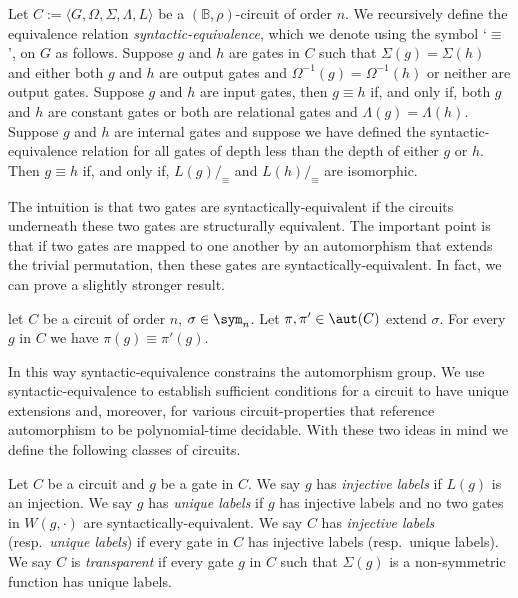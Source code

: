\documentclass[a4paper,UKenglish]{lipics-v2018}
\begin{document}
\begin{definition}
  Let $C := \langle G, \Omega, \Sigma, \Lambda, L \rangle$ be a $(\mathbb{B},
  \rho)$-circuit of order $n$. We recursively define the equivalence relation
  \emph{syntactic-equivalence}, which we denote using the symbol `$\equiv$', on
  $G$ as follows. Suppose $g$ and $h$ are gates in $C$ such that $\Sigma (g) =
  \Sigma(h)$ and either both $g$ and $h$ are output gates and $\Omega^{-1}(g) =
  \Omega^{-1}(h)$ or neither are output gates. Suppose $g$ and $h$ are input
  gates, then $g \equiv h$ if, and only if, both $g$ and $h$ are constant gates
  or both are relational gates and $\Lambda(g) = \Lambda (h)$. Suppose $g$ and
  $h$ are internal gates and suppose we have defined the syntactic-equivalence
  relation for all gates of depth less than the depth of either $g$ or $h$. Then
  $g \equiv h$ if, and only if, $L(g) /_\equiv$ and $L(h) /_\equiv$ are
  isomorphic.
\end{definition}

The intuition is that two gates are syntactically-equivalent if the circuits
underneath these two gates are structurally equivalent. The important point is
that if two gates are mapped to one another by an automorphism that extends the
trivial permutation, then these gates are syntactically-equivalent. In fact, we
can prove a slightly stronger result.

\begin{lemma}
  let $C$ be a circuit of order $n$, $\sigma \in \sym_n$. Let $\pi, \pi' \in
  \aut(C)$ extend $\sigma$. For every $g$ in $C$ we have $\pi (g) \equiv \pi'
  (g)$.
  \label{lem:permutation-extending-syntactic-equivalence}
\end{lemma}

In this way syntactic-equivalence constrains the automorphism group. We use
syntactic-equivalence to establish sufficient conditions for a circuit to have
unique extensions and, moreover, for various circuit-properties that reference
automorphism to be polynomial-time decidable. With these two ideas in mind we
define the following classes of circuits.

\begin{definition}
  Let $C$ be a circuit and $g$ be a gate in $C$. We say $g$ has \emph{injective
    labels} if $L(g)$ is an injection. We say $g$ has \emph{unique labels} if
  $g$ has injective labels and no two gates in $W(g, \cdot)$ are
  syntactically-equivalent. We say $C$ has \emph{injective labels} (resp.\
  \emph{unique labels}) if every gate in $C$ has injective labels (resp.\ unique
  labels). We say $C$ is \emph{transparent} if every gate $g$ in $C$ such that
  $\Sigma(g)$ is a non-symmetric function has unique labels.
\end{definition}
\end{document}
